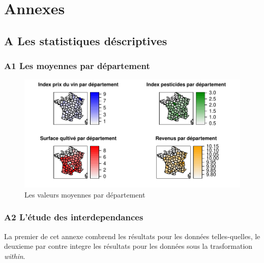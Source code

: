 \documentclass[11pt,]{article}
\begin{document}
\newpage

\hypertarget{annexes}{%
\section{Annexes}\label{annexes}}

\hypertarget{a-les-statistiques-descriptives}{%
\subsection{A Les statistiques
déscriptives}\label{a-les-statistiques-descriptives}}

\hypertarget{a1-les-moyennes-par-departement}{%
\subsubsection{A1 Les moyennes par
département}\label{a1-les-moyennes-par-departement}}

\FloatBarrier

\begin{figure}[!htbp]

{\centering \includegraphics{note2pres_files/figure-latex/unnamed-chunk-51-1} 

}

\caption{Les valeurs moyennes par département}\label{fig:unnamed-chunk-51}
\end{figure}

\FloatBarrier

\newpage

\hypertarget{a2-letude-des-interdependances}{%
\subsubsection{A2 L'étude des
interdependances}\label{a2-letude-des-interdependances}}

La premier de cet annexe combrend les résultats pour les données
telles-quelles, le deuxieme par contre integre les résultats pour les
données sous la trasformation \emph{within}.
\end{document}
